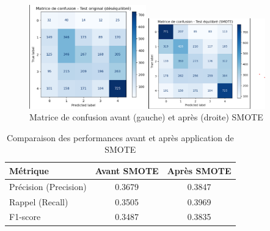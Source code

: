 \documentclass[a4paper,12pt]{article}
\begin{document}
\begin{figure}[H]

    \centering

    \includegraphics[width=0.45\textwidth]{matrice_confusion_avant_smote.png}

    \hfill

    \includegraphics[width=0.45\textwidth]{matrice_confusion_apres_smote.png}

    \caption{Matrice de confusion avant (gauche) et après (droite) SMOTE}

    \label{fig:smote_matrices}

\end{figure}
 
 
\begin{table}[H]

\centering
 
\begin{tabular}{|l|c|c|}

\hline

\textbf{Métrique} & \textbf{Avant SMOTE} & \textbf{Après SMOTE} \\

\hline

Précision (Precision) & 0.3679 & 0.3847 \\

Rappel (Recall)       & 0.3505 & 0.3969 \\

F1-score              & 0.3487 & 0.3835 \\

\hline

\end{tabular}

\caption{Comparaison des performances avant et après application de SMOTE}

\end{table}
 
\end{document}

